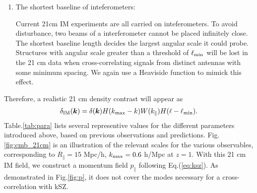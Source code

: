 \begin{enumerate}
\item The shortest baseline of inteferometers:

Current 21cm IM experiments are all carried on inteferometers. To avoid disturbance, two beams of a interferometer cannot be placed infinitely close. The shortest baseline length decides the largest angular scale it could probe. Structures with angular scale greater than a threshold of $\ell_\mathrm{min}$ will be lost in the 21 cm data when cross-correlating signals from distinct antennas with some minimum spacing. We again use a Heaviside function to mimick this effect. 
\end{enumerate}
Therefore, a realistic 21 cm density contrast will appear as 
\begin{eqnarray}
\label{eq:ns}
    \delta_\mathrm{IM}(\bm{k})=\delta(\bm{k})H(k_\mathrm{max}-k)W(k_\parallel)H(\ell-\ell_\mathrm{min}).
\end{eqnarray}
 Table.\ref{tab:para} lists several representive values for the different parameters introduced above, based on previous observations and predictions. Fig. \ref{fig:cmb_21cm} is an illustration of the relevant scales for the various observables, corresponding to $R_\parallel=15$ Mpc/h, $k_\mathrm{max}=0.6$ h/Mpc at $z=1$. With this 21 cm IM field, we construct a momentum field $p_\parallel$ following Eq.(\ref{eq:ksz}). As demonstrated in Fig.\ref{fig:p}, it does not cover the modes necessary for a cross-correlation with kSZ.

